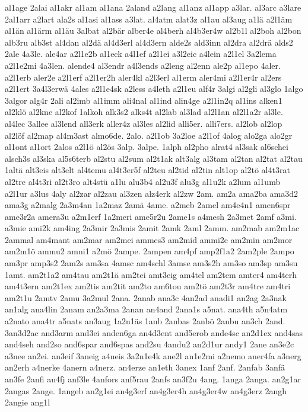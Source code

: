 {al1age
2alai
al1akr
al1am
al1ana
2aland
a2lang
al1anz
al1app
a3lar.
al3arc
a3lare
2al1arr
a2lart
ala2s
al1asi
al1ass
a3lat.
al4atm
alat3z
al1au
al3aug
a1lä
a2l1äm
al1än
al1ärm
al1äu
3albat
al2bär
alber4e
al4berh
al4b3er4w
al2b1l
al2boh
al2bon
alb3ru
alb3st
al4dan
al2dä
al4d3erl
al4d3ern
alde2s
ald3inn
al2dra
al2drä
alds2
2ale
4a3le.
ale4ar
a2l1e2b
al1eck
a4l1ef
a2l1ei
a3l2eic
a4lein
a2l1el
3a2lema
a2l1e2mi
4a3len.
alende4
al3endr
a4l3ends
a2leng
al2enn
ale2p
al1epo
4aler.
a2l1erb
aler2e
a2l1erf
a2l1er2h
aler4kl
a2l3erl
al1erm
aler4mi
a2l1er4r
al2ers
a2l1ert
3a4l3erwä
4ales
a2l1e4sk
a2less
a4leth
a2l1eu
alf4r
3algi
al2gli
al3glo
1algo
3algor
alg4r
2ali
al2imb
al1imm
ali4nal
al1ind
alin4ge
a2l1in2q
al1ins
alken1
al2klö
al2kne
al2kof
1alkoh
alk3s2
alks4t
al2lab
al3lad
al2l1an
al2l1a2r
al3le.
al4lec
3allee
al3lend
all3erk
aller4z
al3les
al2lid
alli5er.
alli7ers.
al2lob
al2lop
al2löf
al2map
al4m3ast
almo6de.
2alo.
a2l1ob
3a2loe
a2l1of
4alog
alo2ga
alo2gr
al1ont
al1ort
2alos
a2l1ö
al2ös
3alp.
3alpe.
1alph
al2pho
alrat4
al3sak
al6schei
alsch3s
al3ska
al5s6terb
al2stu
al2sum
al2t1ak
alt3alg
al3tam
al2tan
al2tat
al2tau
1altä
alt3eis
alt3elt
al4temu
al4t3er5f
al2teu
al2tid
al2tin
alt1op
al2tö
al4t3rat
al2tre
al4t3ri
al2t3ro
alt4stü
a1lu
alu3b4
al2u3f
alu3g
al1u2k
a2lum
al1umb
a2l1ur
a3lus
4aly
al2zar
al2zau
al3zen
alz4erk
al2zw
2am.
am2a
ama2ba
ama3d2
ama3g
a2malg
2a3m4an
1a2maz
2amä
4ame.
a2meb
2amel
am4e4n1
amen6spr
ame3r2a
amera3u
a2m1erf
1a2meri
ame5r2u
2ame1s
a4mesh
2a3met
2amf
a3mi.
a3mie
ami2k
am4ing
2a3mir
2a3mis
2amit
2amk
2aml
2amm.
am2mab
am2m1ac
2ammal
am4mant
am2mar
am2mei
ammes3
am2mid
ammi2e
am2min
am2mor
am2m1ö
ammu2
amni1
a2mö
2ampe.
2ampen
am4pf
amp2f1a2
2am2ple
2ampo
am3pr
amp3s2
2am2s
am3sa
4amsc
am4schl
3amse
am3s2h
am3so
am3sp
am3su
1amt.
am2t1a2
am4tau
am2t1ä
am2tei
amt3eig
am4tel
am2tem
amter4
am4terh
am4t3ern
am2t1ex
am2tis
am2tit
am2to
am6tou
am2tö
am2t3r
am4tre
am4tri
am2t1u
2amtv
2amu
3a2mul
2ana.
2anab
ana3c
4an2ad
anadi1
an2ag
2a3nak
an1alg
ana4lin
2anam
an2a3ma
2anan
an4and
2ana1s
a5nat.
ana4th
a5n4atm
a2nato
ana4tr
a5nats
an3aug
1a2n1äs
1anb
2anbas
2anbö
2anbu
an3ch
2and.
3an3d2ac
and3arm
and3ei
anden6ga
an4d3ent
and5erob
ande4sc
an2d1ex
and4sas
and4seh
and2so
and6spar
and6spas
and2su
4andu2
an2d1ur
andy1
2ane
an3e2c
a3nee
an2ei.
an3eif
3aneig
a4neis
3a2n1e4k
ane2l
an1e2mi
a2nemo
aner4fa
a3nerg
an2erh
a4nerke
4anern
a4nerz.
an4erze
an1eth
3anex
1anf
2anf.
2anfab
3anfä
an3fe
2anfi
an4fj
anf3le
4anfors
anf5rau
2anfs
an3f2u
4ang.
1anga
2anga.
an2g1ar
2angas
2ange.
1angeb
an2g1ei
an4g3erf
an4g3er4h
an4g3er4w
an4g3erz
2angh
2angie
ang1l
}
